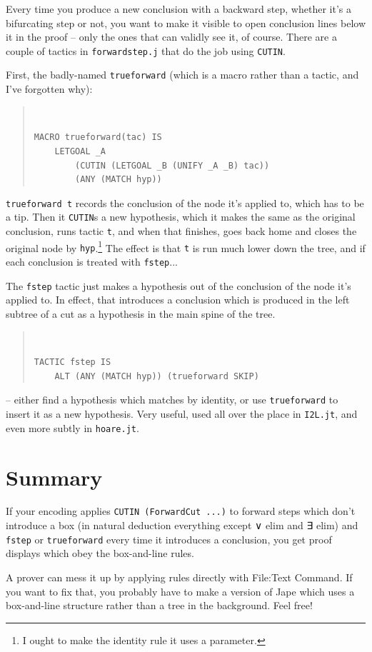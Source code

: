\documentclass[11pt]{article}
\newenvironment{japeish}{\begin{quote}\tt\small}{\end{quote}}
\newcommand{\textj}[1]{{\tt\small{#1}}}
\begin{document}
Every time you produce a new conclusion with a backward step, whether it's a bifurcating step or not, you want to make it visible to open conclusion lines below it in the proof -- only the ones that can validly see it, of course. There are a couple of tactics in \textj{forwardstep.j} that do the job using \textj{CUTIN}.

First, the badly-named \textj{trueforward} (which is a macro rather than a tactic, and I've forgotten why):
\begin{japeish}
\begin{verbatim}
MACRO trueforward(tac) IS
    LETGOAL _A 
        (CUTIN (LETGOAL _B (UNIFY _A _B) tac)) 
        (ANY (MATCH hyp))
\end{verbatim}
\end{japeish}
\textj{trueforward t} records the conclusion of the node it's applied to, which has to be a tip. Then it \textj{CUTIN}s a new hypothesis, which it makes the same as the original conclusion, runs tactic \textj{t}, and when that finishes, goes back home and closes the original node by \textj{hyp}.\footnote{I ought to make the identity rule it uses a parameter.} The effect is that \textj{t} is run much lower down the tree, and if each conclusion is treated with \textj{fstep}...

The \textj{fstep} tactic just makes a hypothesis out of the conclusion of the node it's applied to. In effect, that introduces a conclusion which is produced in the left subtree of a cut as a hypothesis in the main spine of the tree. 
\begin{japeish}
\begin{verbatim}
TACTIC fstep IS
    ALT (ANY (MATCH hyp)) (trueforward SKIP)
\end{verbatim}
\end{japeish}
-- either find a hypothesis which matches by identity, or use \textj{trueforward} to insert it as a new hypothesis. Very useful, used all over the place in \textj{I2L.jt}, and even more subtly in \textj{hoare.jt}.

\section{Summary}

If your encoding applies \textj{CUTIN (ForwardCut ...)} to forward steps which don't introduce a box (in natural deduction everything except ∨ elim and ∃ elim) and \textj{fstep} or \textj{trueforward} every time it introduces a conclusion, you get proof displays which obey the box-and-line rules. 

A prover can mess it up by applying rules directly with File:Text Command. If you want to fix that, you probably have to make a version of Jape which uses a box-and-line structure rather than a tree in the background. Feel free!


 
\end{document}
